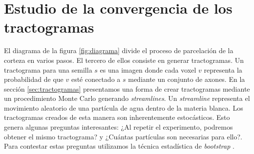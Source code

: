 \section{Estudio de la convergencia de los tractogramas}
\label{sec:convergencia}

El diagrama de la figura \ref{fig:diagrama} divide el proceso de 
parcelaci\'on de la corteza en varios pasos. El tercero de ellos consiste
en generar tractogramas. Un tractograma para una semilla $s$ es una imagen
donde cada voxel $v$ representa la probabilidad de que $v$ est\'e 
conectado a $s$ mediante un conjunto de axones. En la secci\'on 
\ref{sec:tractogramas} presentamos una forma de crear tractogramas
mediante un procedimiento Monte Carlo generando \textit{streamlines}. Un
\textit{streamline} representa el movimiento aleatorio de una part\'icula
de agua dentro de la materia blanca. Los tractogramas creados de esta
manera son inherentemente estoc\'asticos. Esto genera algunas preguntas
interesantes: ¿Al repetir el experimento, podremos obtener el mismo
tractograma? y ¿Cu\'antas part\'iculas son necesarias para ello?. Para
contestar estas preguntas utilizamos la t\'ecnica estad\'istica de 
\textit{bootstrap} \cite{Efron1982}. \\

\settowidth{}
\addtolength\mylen{\parindent}

